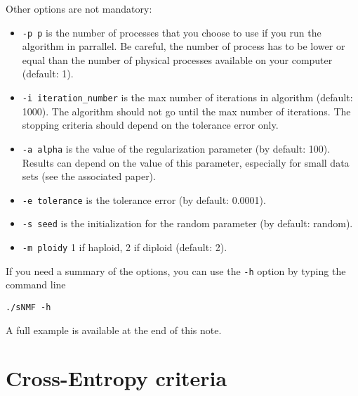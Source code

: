 \documentclass[10pt,a4paper]{article}
\begin{document}
\noindent
Other options are not mandatory:
\begin{itemize}
\item \verb|-p p| is the number of processes that you choose to use if you run the algorithm in 
parrallel. Be careful, the number of process has to be lower or equal than the number of physical 
processes available on your computer (default: 1).
\item \verb|-i iteration_number| is the max number of iterations in algorithm (default: 1000). 
The algorithm should not go until the max number of iterations. The stopping criteria should depend on the tolerance error only.
\item \verb|-a alpha| is the value of the regularization parameter (by default: 100). Results can depend on the value of this parameter, especially for small data sets (see the associated paper). 
\item \verb|-e tolerance| is the tolerance error (by default: 0.0001). 
\item \verb|-s seed| is the initialization for the random parameter (by default: random). 
\item \verb|-m ploidy|  1 if haploid, 2 if diploid (default: 2). 
\end{itemize}


\noindent
If you need a summary of the options, you can use the \verb|-h| option by typing the command line
\footnotesize
\begin{Verbatim}[frame=single]
./sNMF -h
\end{Verbatim}
\noindent
\normalsize

\noindent
A full example is available at the end of this note.

\section{Cross-Entropy criteria}
\end{document}
